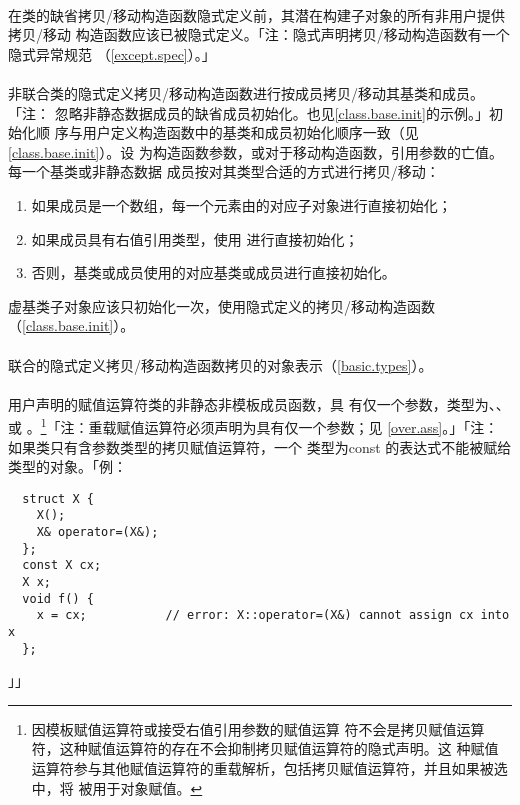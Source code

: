 \paragraph{}
在类的缺省拷贝/移动构造函数隐式定义前，其潜在构建子对象的所有非用户提供拷贝/移动
构造函数应该已被隐式定义。「注：隐式声明拷贝/移动构造函数有一个隐式异常规范
（\ref{except.spec}）。」

\paragraph{}
非联合类的隐式定义拷贝/移动构造函数进行按成员拷贝/移动其基类和成员。「注：
忽略非静态数据成员的缺省成员初始化。也见\ref{class.base.init}的示例。」初始化顺
序与用户定义构造函数中的基类和成员初始化顺序一致（见\ref{class.base.init}）。设
为构造函数参数，或对于移动构造函数，引用参数的亡值。每一个基类或非静态数据
成员按对其类型合适的方式进行拷贝/移动：
\begin{enumerate}
  \item{如果成员是一个数组，每一个元素由的对应子对象进行直接初始化；}
  \item{如果成员具有右值引用类型，使用
    进行直接初始化；}
  \item{否则，基类或成员使用的对应基类或成员进行直接初始化。}
\end{enumerate}
虚基类子对象应该只初始化一次，使用隐式定义的拷贝/移动构造函数
（\ref{class.base.init}）。

\paragraph{}
联合的隐式定义拷贝/移动构造函数拷贝的对象表示（\ref{basic.types}）。

\paragraph{}
用户声明的赋值运算符类的非静态非模板成员函数，具
有仅一个参数，类型为、、或
。\footnote{因模板赋值运算符或接受右值引用参数的赋值运算
符不会是拷贝赋值运算符，这种赋值运算符的存在不会抑制拷贝赋值运算符的隐式声明。这
种赋值运算符参与其他赋值运算符的重载解析，包括拷贝赋值运算符，并且如果被选中，将
被用于对象赋值。}「注：重载赋值运算符必须声明为具有仅一个参数；见
\ref{over.ass}。」「注：如果类只有含参数类型的拷贝赋值运算符，一个
类型为const 的表达式不能被赋给类型的对象。「例：
\begin{lstlisting}
  struct X {
    X();
    X& operator=(X&);
  };
  const X cx;
  X x;
  void f() {
    x = cx;           // error: X::operator=(X&) cannot assign cx into x
  };
\end{lstlisting}」」

